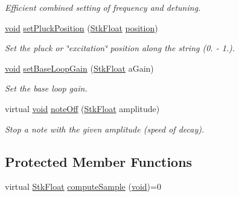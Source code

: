 \begin{DoxyCompactItemize}
\begin{DoxyCompactList}\small\item\em Efficient combined setting of frequency and detuning. \end{DoxyCompactList}\item 
\hyperlink{sound_8c_ae35f5844602719cf66324f4de2a658b3}{void} \hyperlink{class_nyq_1_1_pluck_two_a19e85f95a18ebce255feb38af4590f86}{set\+Pluck\+Position} (\hyperlink{namespace_nyq_a044fa20a706520a617bbbf458a7db7e4}{Stk\+Float} \hyperlink{structposition}{position})
\begin{DoxyCompactList}\small\item\em Set the pluck or \char`\"{}excitation\char`\"{} position along the string (0. -\/ 1.). \end{DoxyCompactList}\item 
\hyperlink{sound_8c_ae35f5844602719cf66324f4de2a658b3}{void} \hyperlink{class_nyq_1_1_pluck_two_a719922528ec05fcae2d98e6cfc386587}{set\+Base\+Loop\+Gain} (\hyperlink{namespace_nyq_a044fa20a706520a617bbbf458a7db7e4}{Stk\+Float} a\+Gain)
\begin{DoxyCompactList}\small\item\em Set the base loop gain. \end{DoxyCompactList}\item 
virtual \hyperlink{sound_8c_ae35f5844602719cf66324f4de2a658b3}{void} \hyperlink{class_nyq_1_1_pluck_two_aa29a00e96468d509a5c5147691a750a6}{note\+Off} (\hyperlink{namespace_nyq_a044fa20a706520a617bbbf458a7db7e4}{Stk\+Float} amplitude)
\begin{DoxyCompactList}\small\item\em Stop a note with the given amplitude (speed of decay). \end{DoxyCompactList}\end{DoxyCompactItemize}
\subsection*{Protected Member Functions}
\begin{DoxyCompactItemize}
\item 
virtual \hyperlink{namespace_nyq_a044fa20a706520a617bbbf458a7db7e4}{Stk\+Float} \hyperlink{class_nyq_1_1_pluck_two_a35ecfb2e9bb519fc5f0e5b217535f4f9}{compute\+Sample} (\hyperlink{sound_8c_ae35f5844602719cf66324f4de2a658b3}{void})=0
\end{DoxyCompactItemize}
